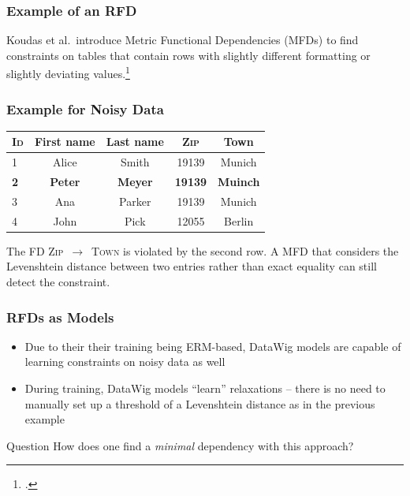 \documentclass{beamer}
\begin{document}
\begin{frame}
    \frametitle{Example of an RFD}
    \begin{Example}
        Koudas et al.\ introduce Metric Functional Dependencies (MFDs) to find constraints on tables that contain rows with slightly different formatting or slightly deviating values.\footcite{KOU09}
    \end{Example}
\end{frame}

\begin{frame}
    \frametitle{Example for Noisy Data}
    \begin{table}[ht]
        \centering
        \begin{tabular}{lcccc}
            \toprule
            \toprule
            \textsc{Id} & First name & Last name & \textsc{Zip} & Town \\
            \midrule
            1 & Alice & Smith & 19139 & Munich \\
            \textbf{2} & \textbf{Peter}& \textbf{Meyer} & \textbf{19139} & \textbf{Muinch} \\
            3 & Ana & Parker & 19139 & Munich \\
            4 & John & Pick & 12055 & Berlin \\
            \bottomrule
            \bottomrule
        \end{tabular}
    \end{table}
The FD \textsc{Zip}~$\rightarrow$~\textsc{Town} is violated by the second row. A MFD that considers the Levenshtein distance between two entries rather than exact equality can still detect the constraint.
\end{frame}

\begin{frame}
    \frametitle{RFDs as Models}
    \begin{itemize}
        \item Due to their their training being ERM-based, DataWig models are capable of learning constraints on noisy data as well
        \item During training, DataWig models ``learn'' relaxations -- there is no need to manually set up a threshold of a Levenshtein distance as in the previous example
    \end{itemize}
    \pause
    \begin{block}{Question}
        How does one find a \emph{minimal} dependency with this approach?
    \end{block}
\end{frame}
\end{document}
